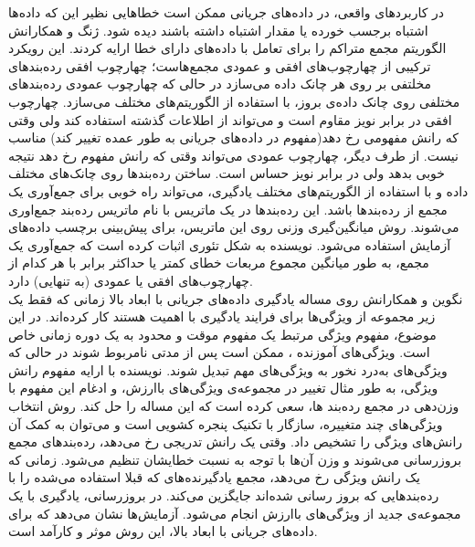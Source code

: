 در کاربردهای واقعی، در داده‌های جریانی ممکن است خطاهایی نظیر این که داده‌ها اشتباه برجسب خورده‌ یا مقدار اشتباه داشته باشند دیده شود. ژنگ
و همکارانش \cite{zhang2011robust} الگوریتم مجمع متراکم را برای تعامل با داده‌های دارای خطا ارایه کردند. این رویکرد ترکیبی از چهارچوب‌های افقی و عمودی مجمع‌هاست؛ چهارچوب افقی رده‌بندهای مخلتفی بر روی هر چانک داده می‌سازد در حالی که چهارچوب عمودی رده‌بندهای مختلفی روی چانک داده‌ی بروز، با استفاده از الگوریتم‌های مختلف می‌سازد. چهارچوب افقی در برابر نویز مقاوم است و می‌تواند از اطلاعات گذشته استفاده کند ولی وقتی که رانش مفهومی رخ دهد(مفهوم در داده‌های جریانی به طور عمده تغییر کند) مناسب نیست. از طرف دیگر، چهارچوب عمودی می‌تواند وقتی که رانش مفهوم رخ دهد نتیجه خوبی بدهد ولی در برابر نویز حساس است. ساختن رده‌بندها روی چانک‌های مختلف داده و با استفاده از الگوریتم‌های مختلف یادگیری، می‌تواند راه خوبی برای جمع‌آوری یک مجمع از رده‌بندها باشد. این رده‌بندها در یک ماتریس با نام ماتریس رده‌بند
جمع‌اوری می‌شوند. روش میانگین‌گیری وزنی روی این ماتریس، برای پیش‌بینی برچسب داده‌های آزمایش استفاده می‌شود. نویسنده به شکل تئوری اثبات کرده است که جمع‌‌آوری یک مجمع، به طور میانگین مجموع مربعات خطای کمتر یا حداکثر برابر با هر کدام از چهارچوب‌های افقی یا عمودی (به تنهایی) دارد.
\\


نگوین
و همکارانش \cite{nguyen2012heterogeneous} روی مساله یادگیری داده‌های جریانی با ابعاد بالا زمانی که فقط یک زیر مجموعه از ویژگی‌ها برای فرایند یادگیری با اهمیت هستند کار کرده‌اند. در این موضوع، مفهوم ویژگی‌ مرتبط یک مفهوم موقت و محدود به یک دوره زمانی خاص است. ویژگی‌های آموزنده
، ممکن است پس از مدتی نامربوط شوند در حالی که ویژگی‌های به‌درد نخور به ویژگی‌های مهم تبدیل شوند. نویسنده با ارایه مفهوم رانش ویژگی، به طور مثال تغییر در مجموعه‌ی ویژگی‌های باارزش، و ادغام این مفهوم با وزن‌دهی در مجمع رده‌بند ها، سعی کرده است که این مساله را حل کند. روش انتخاب ویژگی‌های چند متغییره، سازگار با تکنیک پنجره کشویی است و می‌توان به کمک آن رانش‌های ویژگی را تشخیص داد.
وقتی یک رانش تدریجی رخ‌ می‌دهد، رده‌بندهای مجمع بروزرسانی می‌شوند و وزن آن‌ها با توجه به نسبت خطایشان تنظیم می‌شود. زمانی که یک رانش ویژگی رخ می‌دهد، مجمع یادگیرنده‌های که قبلا استفاده می‌شده را با رده‌بندهایی که بروز رسانی شده‌اند جایگزین می‌کند. در بروزرسانی، یادگیری با یک مجموعه‌ی جدید از ویژگی‌های باارزش انجام می‌شود. آزمایش‌ها نشان می‌دهد که برای داده‌های جریانی با ابعاد بالا، این روش موثر و کارآمد است.
